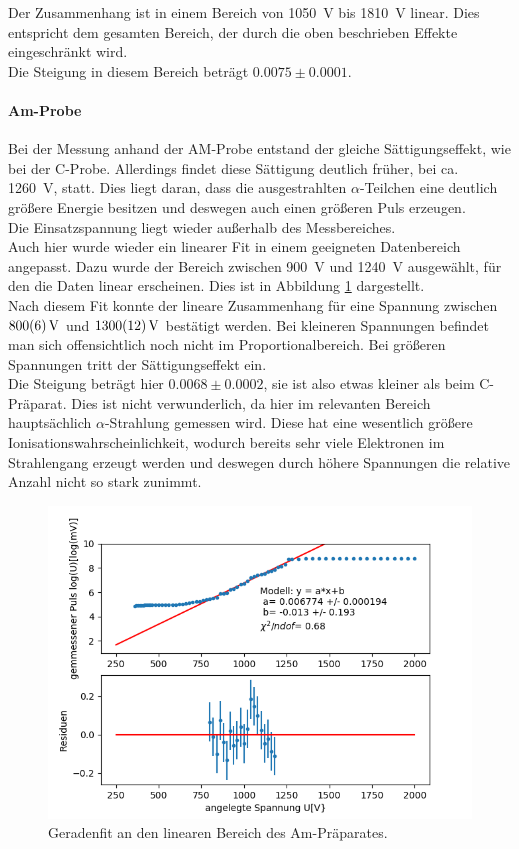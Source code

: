 \documentclass[12pt,a4paper]{article}
\begin{document}
Der Zusammenhang ist in einem Bereich von \SI{1050}{V} bis \SI{1810}{V} linear. Dies entspricht dem gesamten Bereich, der durch die oben beschrieben Effekte eingeschränkt wird.\\
Die Steigung in diesem Bereich beträgt $0.0075\pm 0.0001$.

\paragraph{Am-Probe}
Bei der Messung anhand der AM-Probe entstand der gleiche Sättigungseffekt, wie bei der C-Probe. Allerdings findet diese Sättigung deutlich früher, bei ca. \SI{1260}{V}, statt. Dies liegt daran, dass die ausgestrahlten $\alpha$-Teilchen eine deutlich größere Energie besitzen und deswegen auch einen größeren Puls erzeugen.\\
Die Einsatzspannung liegt wieder außerhalb des Messbereiches.\\
Auch hier wurde wieder ein linearer Fit in einem geeigneten Datenbereich angepasst. Dazu wurde der Bereich zwischen \SI{900}{V} und \SI{1240}{V} ausgewählt, für den die Daten linear erscheinen. Dies ist in Abbildung \ref{fig:AMPulsfit} dargestellt.\\
Nach diesem Fit konnte der lineare Zusammenhang für eine Spannung zwischen $\SI{800\pm 6}{V}$ und $\SI{1300\pm 12}{V}$ bestätigt werden. Bei kleineren Spannungen befindet man sich offensichtlich noch nicht im Proportionalbereich. Bei größeren Spannungen tritt der Sättigungseffekt ein.\\
Die Steigung beträgt hier $0.0068\pm 0.0002$, sie ist also etwas kleiner als beim C-Präparat. Dies ist nicht verwunderlich, da hier im relevanten Bereich hauptsächlich $\alpha$-Strahlung gemessen wird. Diese hat eine wesentlich größere Ionisationswahrscheinlichkeit, wodurch bereits sehr viele Elektronen im Strahlengang erzeugt werden und deswegen durch höhere Spannungen die relative Anzahl nicht so stark zunimmt.



\begin{figure}
\centering
\includegraphics[scale=0.8]{Bilder/Prop/AM_Pulsfit.PNG}
\caption{Geradenfit an den linearen Bereich des Am-Präparates.}
\label{fig:AMPulsfit}
\end{figure}
\newpage
\end{document}
